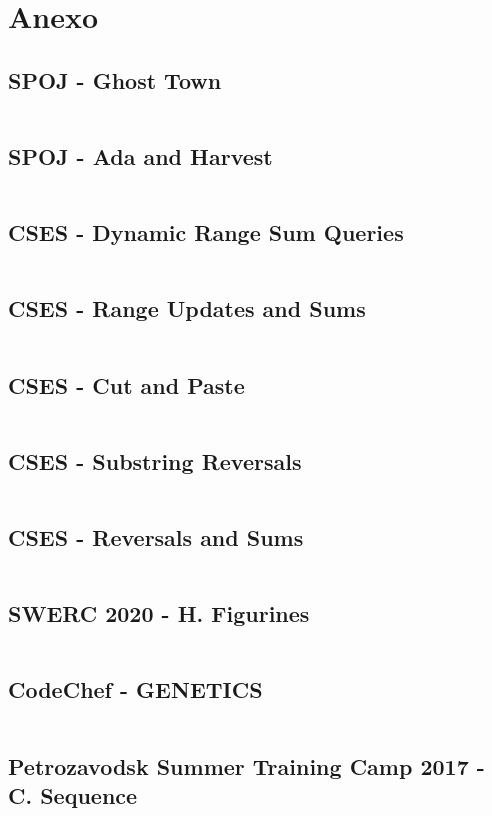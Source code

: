 \section{Anexo}

\subsection{SPOJ - Ghost Town}
\inputminted{c++}{Implementaciones/Ghost_Town.cpp}

\subsection{SPOJ - Ada and Harvest}
\inputminted{c++}{Implementaciones/Ada_and_Harvest.cpp}

\subsection{CSES - Dynamic Range Sum Queries}
\inputminted{c++}{Implementaciones/Dynamic_Range_Sum_Queries.cpp}

\subsection{CSES - Range Updates and Sums}
\inputminted{c++}{Implementaciones/Range_Updates_and_Sums.cpp}

\subsection{CSES - Cut and Paste}
\inputminted{c++}{Implementaciones/Cut_and_Paste.cpp}

\subsection{CSES - Substring Reversals}
\inputminted{c++}{Implementaciones/Substring_Reversals.cpp}

\subsection{CSES - Reversals and Sums}
\inputminted{c++}{Implementaciones/Reversals_and_Sums.cpp}

\subsection{SWERC 2020 - H. Figurines}
\inputminted{c++}{Implementaciones/H_Figurines.cpp}

\subsection{CodeChef - GENETICS}
\inputminted{c++}{Implementaciones/Genetics.cpp}

\subsection{Petrozavodsk Summer Training Camp 2017 - C. Sequence}
\inputminted{c++}{Implementaciones/Sequence.cpp}